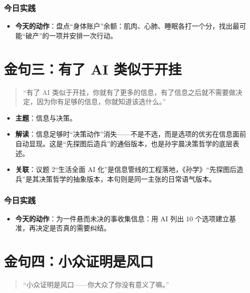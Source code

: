\subsubsection{今日实践}

\begin{itemize}
\tightlist
\item
  \textbf{今天的动作}：盘点``身体账户''余额：肌肉、心肺、睡眠各打一个分，找出最可能``破产''的一项并安排一次行动。
\end{itemize}

\section{金句三：有了 AI
类似于开挂}

\begin{quote}
``有了 AI
类似于开挂，你就有了更多的信息，有了信息之后就不需要做决定，因为你有足够的信息，你就知道该选什么。''
\end{quote}

\begin{itemize}
\tightlist
\item
  \textbf{主题}：信息与决策。
\item
  \textbf{解读}：信息足够时``决策动作''消失------不是不选，而是选项的优劣在信息面前自动显现。这是``先探图后造兵''的通俗版本，也是孙宇晨决策哲学的底层表述。
\item
  \textbf{关联}：议题 2``生活全面 AI
  化''是信息管线的工程落地，《孙学》``先探图后造兵''是其决策哲学的抽象版本，本句则是同一主张的日常语气版本。
\end{itemize}

\subsubsection{今日实践}

\begin{itemize}
\tightlist
\item
  \textbf{今天的动作}：为一件悬而未决的事收集信息：用 AI 列出 10
  个选项建立基准，再决定是否真的需要纠结。
\end{itemize}

\section{金句四：小众证明是风口}

\begin{quote}
``小众证明是风口------你大众了你没有意义了嘛。''
\end{quote}


